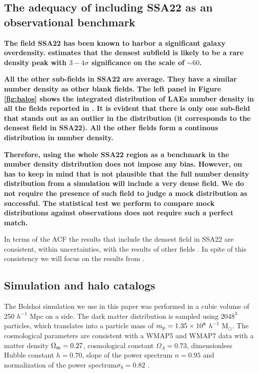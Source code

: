 \documentclass[usenatbib]{mn2e}
\newcommand{\hMpc}{{\ifmmode{h^{-1}{\rm Mpc}}\else{$h^{-1}$Mpc }\fi}}
\begin{document}
\subsection{The adequacy of including SSA22 as an observational benchmark}

{\bf The field SSA22 has been known to harbor a significant
  galaxy overdensity. \cite{Yamada2012} estimates that the densest
  subfield is likely to be a rare density peak with $3-4\sigma$
  significance on the scale of $\sim 60$\hMpc. }

{\bf All the other sub-fields in SSA22 are average. They have a similar
  number density as other blank fields. The left panel in Figure
  \ref{fig:halos} shows the integrated distribution of LAEs number
  density in all the fields reported in  \cite{Yamada2012}. It is
  evident that there is only one sub-field  that stands out as an
  outlier in the distribution (it corresponds to  the densest field in
  SSA22). All the other fields form a continous  distribution in
  number density.}   

{\bf Therefore, using the whole SSA22 region as a benchmark in the
  number density distribution does not impose any bias. However, on
  has to  keep in mind that is not plausible that the full number
  density distribution from a simulation will include a very dense
  field. We do not require the presence of such field to judge a mock
  distribution as successful. The statistical test we perform to
  compare mock distributions   against   observations does not require
  such a perfect match.  
  
  In terms of the ACF the results that include the densest
  field in SSA22 \citep{Hayashino2004} are consistent, within 
  uncertainties, with the results of other fields
  \citep{Ouchi2008}. In spite of this consistency we will focus on the
  results from \citep{Ouchi2008}.} 


\subsection{Simulation and halo catalogs}

The Bolshoi simulation \citep{Bolshoi} we use in this paper was
performed in a cubic volume of 250 $h^{-1}$ Mpc on a side. The
dark matter distribution is sampled using $2048^{3}$ particles, which
translates into a particle mass of $m_{\rm p}=1.35\times 10^{8}$
$h^{-1}$ M$_{\odot}$.  The cosmological parameters are consistent with
a WMAP5 and WMAP7 data with a matter density $\Omega_{\rm m} = 0.27$,
cosmological constant $\Omega_{\Lambda}=0.73$, dimensionless Hubble constant
$h=0.70$, slope of the power spectrum $n=0.95$ and normalization of the
power spectrum$\sigma_{8}=0.82$ \citep{Komatsu2009,Jarosik2011}.  
\end{document}
